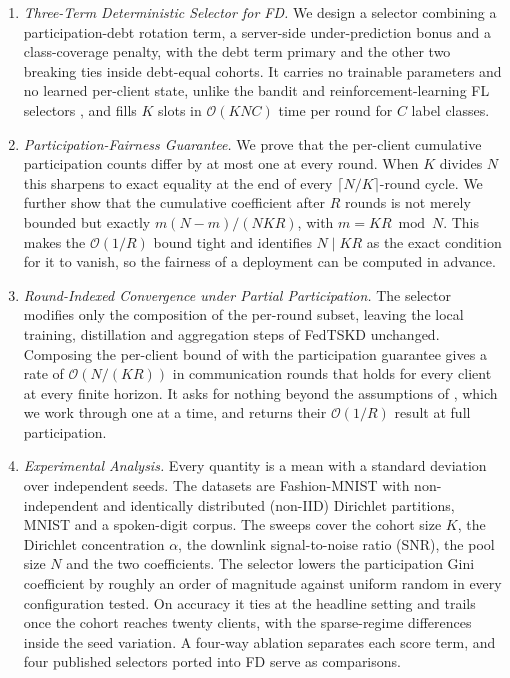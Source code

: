 \documentclass[journal]{IEEEtran}
\newcommand{\rev}[1]{{\color{blue}#1}}
\begin{document}
\begin{enumerate}
    \item \textit{Three-Term Deterministic Selector for FD.} We design a selector combining a participation-debt rotation term, a server-side under-prediction bonus and a class-coverage penalty, with the debt term primary and the other two breaking ties inside debt-equal cohorts. It carries no trainable parameters and no learned per-client state, unlike the bandit and reinforcement-learning FL selectors \rev{\cite{kazemi2026robust, xia2020mab}}, and fills $K$ slots in $\mathcal{O}(KNC)$ time per round for $C$ label classes.

    \item \textit{Participation-Fairness Guarantee.} We prove that the per-client cumulative participation counts differ by at most one at every round. When $K$ divides $N$ this sharpens to exact equality at the end of every $\lceil N/K \rceil$-round cycle. \rev{We further show that the cumulative coefficient after $R$ rounds is not merely bounded but exactly $m(N-m)/(NKR)$, with $m = KR \bmod N$. This makes the $\mathcal{O}(1/R)$ bound tight and identifies $N \mid KR$ as the exact condition for it to vanish, so the fairness of a deployment can be computed in advance.}

    \item \textit{\rev{Round-Indexed Convergence under Partial Participation.}} The selector modifies only the composition of the per-round subset, leaving the local training, distillation and aggregation steps of FedTSKD \cite{mu2024fedtskd} unchanged. \rev{Composing the per-client bound of \cite{mu2024fedtskd} with the participation guarantee gives a rate of $\mathcal{O}(N/(KR))$ in communication rounds that holds for every client at every finite horizon. It asks for nothing beyond the assumptions of \cite{mu2024fedtskd}, which we work through one at a time, and returns their $\mathcal{O}(1/R)$ result at full participation.}

    \item \textit{Experimental Analysis.} \rev{Every quantity is a mean with a standard deviation over independent seeds. The datasets are Fashion-MNIST with non-independent and identically distributed (non-IID) Dirichlet partitions, MNIST and a spoken-digit corpus. The sweeps cover the cohort size $K$, the Dirichlet concentration $\alpha$, the downlink signal-to-noise ratio (SNR), the pool size $N$ and the two coefficients. The selector lowers the participation Gini coefficient by roughly an order of magnitude against uniform random in every configuration tested. On accuracy it ties at the headline setting and trails once the cohort reaches twenty clients, with the sparse-regime differences inside the seed variation. A four-way ablation separates each score term, and four published selectors ported into FD serve as comparisons.}
\end{enumerate}
\end{document}
